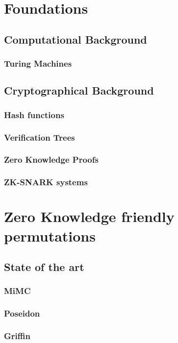 \documentclass[target=mst]{thud}
\begin{document}
\part{Foundations}\label{part:foundation}

\chapter{Computational Background}
\section{Turing Machines}
\section{}
\chapter{Cryptographical Background}
\section{Hash functions}
\section{Verification Trees}
\section{Zero Knowledge Proofs}
\section{ZK-SNARK systems}

\part{Zero Knowledge friendly permutations}\label{part:zk-hash}
\chapter{State of the art}
\section{MiMC}
\section{Poseidon}
\section{Griffin}
\end{document}
